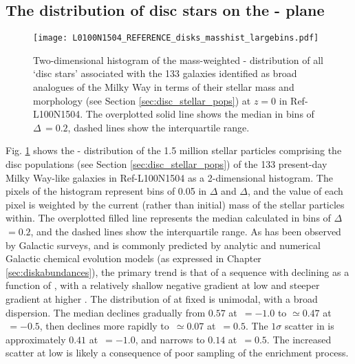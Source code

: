 \subsection{The distribution of disc stars on the \afe{}-\feh{} plane}
\label{sec:stacked_afe_feh}

\begin{figure}
\texttt{[image: L0100N1504\_REFERENCE\_disks\_masshist\_largebins.pdf]}
\caption[The mass weighted \afe{}-\feh{} distribution of stacked `disk stars' inside Milky Way mass galaxies in the Ref-L100N1504 simulation]{\label{fig:afestack} Two-dimensional histogram of the mass-weighted \afe{}-\feh{} distribution of all `disc stars' associated with the 133 galaxies identified as broad analogues of the Milky Way in terms of their stellar mass and morphology (see Section \ref{sec:disc_stellar_pops}) at $z=0$ in Ref-L100N1504. The overplotted solid line shows the median \afe{} in bins of $\Delta$\feh{}\,$=0.2$, dashed lines show the interquartile range.}
\end{figure}

Fig. \ref{fig:afestack} shows the \afe{}-\feh{} distribution of the 1.5 million stellar particles comprising the disc populations (see Section \ref{sec:disc_stellar_pops}) of the 133 present-day Milky Way-like galaxies in Ref-L100N1504 as a 2-dimensional histogram. The pixels of the histogram represent bins of 0.05 in $\Delta$\afe{} and $\Delta$\feh{}, and the value of each pixel is weighted by the current (rather than initial) mass of the stellar particles within. The overplotted filled line represents the median \afe{} calculated in bins of $\Delta$\feh{}$=0.2$, and the dashed lines show the interquartile range. As has been observed by Galactic surveys, and is commonly predicted by analytic and numerical Galactic chemical evolution models (as expressed in Chapter \ref{sec:diskabundances}), the primary trend is that of a sequence with declining \afe{} as a function of \feh{}, with a relatively shallow negative gradient at low \feh{} and steeper gradient at higher \feh{}. The distribution of \afe{} at fixed \feh{} is unimodal, with a broad dispersion. The median \afe{} declines gradually from $0.57$ at \feh{}$\,=-1.0$ to $\simeq 0.47$ at \feh{}$\,=-0.5$, then declines more rapidly to \afe{}$\,\simeq 0.07$ at \feh{}$\,=0.5$. The $1\sigma$ scatter in \afe{} is approximately $0.41$ at \feh{}$\,=-1.0$, and narrows to $0.14$ at \feh{}$\,=0.5$. The increased scatter at low \feh{} is likely a consequence of poor sampling of the enrichment process.

